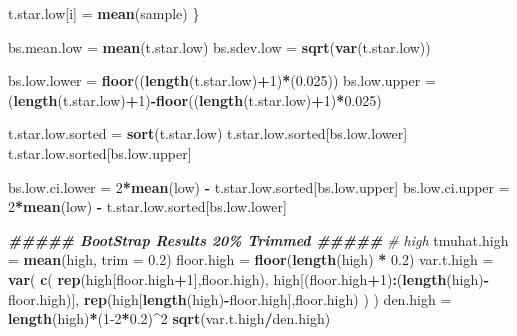 \documentclass[
]{article}
\newenvironment{Shaded}{\begin{snugshade}}{\end{snugshade}}
\newcommand{\AttributeTok}[1]{\textcolor[rgb]{0.13,0.29,0.53}{#1}}
\newcommand{\CommentTok}[1]{\textcolor[rgb]{0.56,0.35,0.01}{\textit{#1}}}
\newcommand{\DecValTok}[1]{\textcolor[rgb]{0.00,0.00,0.81}{#1}}
\newcommand{\DocumentationTok}[1]{\textcolor[rgb]{0.56,0.35,0.01}{\textbf{\textit{#1}}}}
\newcommand{\FloatTok}[1]{\textcolor[rgb]{0.00,0.00,0.81}{#1}}
\newcommand{\FunctionTok}[1]{\textcolor[rgb]{0.13,0.29,0.53}{\textbf{#1}}}
\newcommand{\NormalTok}[1]{#1}
\newcommand{\OtherTok}[1]{\textcolor[rgb]{0.56,0.35,0.01}{#1}}
\newcommand{\SpecialCharTok}[1]{\textcolor[rgb]{0.81,0.36,0.00}{\textbf{#1}}}
\begin{document}
\begin{Shaded}
\begin{Highlighting}[]
\NormalTok{    t.star.low[i] }\OtherTok{=} \FunctionTok{mean}\NormalTok{(sample)}
\NormalTok{\}}

\NormalTok{bs.mean.low }\OtherTok{=} \FunctionTok{mean}\NormalTok{(t.star.low)}
\NormalTok{bs.sdev.low }\OtherTok{=} \FunctionTok{sqrt}\NormalTok{(}\FunctionTok{var}\NormalTok{(t.star.low))}

\NormalTok{bs.low.lower }\OtherTok{=} \FunctionTok{floor}\NormalTok{((}\FunctionTok{length}\NormalTok{(t.star.low)}\SpecialCharTok{+}\DecValTok{1}\NormalTok{)}\SpecialCharTok{*}\NormalTok{(}\FloatTok{0.025}\NormalTok{))}
\NormalTok{bs.low.upper }\OtherTok{=}\NormalTok{ (}\FunctionTok{length}\NormalTok{(t.star.low)}\SpecialCharTok{+}\DecValTok{1}\NormalTok{)}\SpecialCharTok{{-}}\FunctionTok{floor}\NormalTok{((}\FunctionTok{length}\NormalTok{(t.star.low)}\SpecialCharTok{+}\DecValTok{1}\NormalTok{)}\SpecialCharTok{*}\FloatTok{0.025}\NormalTok{)}

\NormalTok{t.star.low.sorted }\OtherTok{=} \FunctionTok{sort}\NormalTok{(t.star.low)}
\NormalTok{t.star.low.sorted[bs.low.lower]}
\NormalTok{t.star.low.sorted[bs.low.upper]}

\NormalTok{bs.low.ci.lower }\OtherTok{=} \DecValTok{2}\SpecialCharTok{*}\FunctionTok{mean}\NormalTok{(low) }\SpecialCharTok{{-}}\NormalTok{ t.star.low.sorted[bs.low.upper]}
\NormalTok{bs.low.ci.upper }\OtherTok{=} \DecValTok{2}\SpecialCharTok{*}\FunctionTok{mean}\NormalTok{(low) }\SpecialCharTok{{-}}\NormalTok{ t.star.low.sorted[bs.low.lower]}

\DocumentationTok{\#\#\#\#\# BootStrap Results 20\% Trimmed \#\#\#\#\#}
\CommentTok{\# high}
\NormalTok{tmuhat.high }\OtherTok{=} \FunctionTok{mean}\NormalTok{(high, }\AttributeTok{trim =} \FloatTok{0.2}\NormalTok{)}
\NormalTok{floor.high }\OtherTok{=} \FunctionTok{floor}\NormalTok{(}\FunctionTok{length}\NormalTok{(high) }\SpecialCharTok{*} \FloatTok{0.2}\NormalTok{)}
\NormalTok{var.t.high }\OtherTok{=} \FunctionTok{var}\NormalTok{(}
    \FunctionTok{c}\NormalTok{(}
        \FunctionTok{rep}\NormalTok{(high[floor.high}\SpecialCharTok{+}\DecValTok{1}\NormalTok{],floor.high),}
\NormalTok{        high[(floor.high}\SpecialCharTok{+}\DecValTok{1}\NormalTok{)}\SpecialCharTok{:}\NormalTok{(}\FunctionTok{length}\NormalTok{(high)}\SpecialCharTok{{-}}\NormalTok{floor.high)],}
        \FunctionTok{rep}\NormalTok{(high[}\FunctionTok{length}\NormalTok{(high)}\SpecialCharTok{{-}}\NormalTok{floor.high],floor.high)}
\NormalTok{    )}
\NormalTok{)}
\NormalTok{den.high }\OtherTok{=} \FunctionTok{length}\NormalTok{(high)}\SpecialCharTok{*}\NormalTok{(}\DecValTok{1{-}2}\SpecialCharTok{*}\FloatTok{0.2}\NormalTok{)}\SpecialCharTok{\^{}}\DecValTok{2}
\FunctionTok{sqrt}\NormalTok{(var.t.high}\SpecialCharTok{/}\NormalTok{den.high)}


\end{Highlighting}
\end{Shaded}
\end{document}
